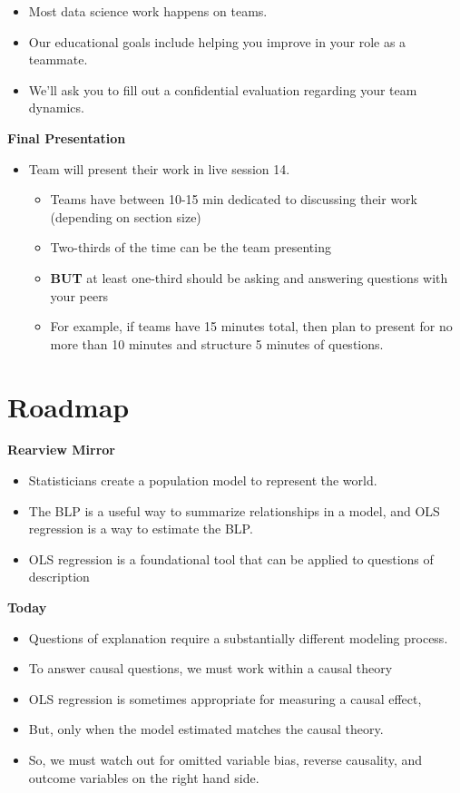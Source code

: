 \documentclass[
]{book}
\providecommand{\tightlist}{%
  \setlength{\itemsep}{0pt}\setlength{\parskip}{0pt}}
\theoremstyle{definition}
\theoremstyle{definition}
\theoremstyle{definition}
\theoremstyle{definition}
\theoremstyle{remark}
\begin{document}
\begin{itemize}
\tightlist
\item
  Most data science work happens on teams.
\item
  Our educational goals include helping you improve in your role as a teammate.
\item
  We'll ask you to fill out a confidential evaluation regarding your team dynamics.
\end{itemize}

\textbf{Final Presentation}

\begin{itemize}
\tightlist
\item
  Team will present their work in live session 14.

  \begin{itemize}
  \tightlist
  \item
    Teams have between 10-15 min dedicated to discussing their work (depending on section size)
  \item
    Two-thirds of the time can be the team presenting
  \item
    \textbf{BUT} at least one-third should be asking and answering questions with your peers
  \item
    For example, if teams have 15 minutes total, then plan to present for no more than 10 minutes and structure 5 minutes of questions.
  \end{itemize}
\end{itemize}

\hypertarget{roadmap-8}{%
\section{Roadmap}\label{roadmap-8}}

\textbf{Rearview Mirror}

\begin{itemize}
\tightlist
\item
  Statisticians create a population model to represent the world.
\item
  The BLP is a useful way to summarize relationships in a model, and OLS regression is a way to estimate the BLP.
\item
  OLS regression is a foundational tool that can be applied to questions of description
\end{itemize}

\textbf{Today}

\begin{itemize}
\tightlist
\item
  Questions of explanation require a substantially different modeling process.
\item
  To answer causal questions, we must work within a causal theory
\item
  OLS regression is sometimes appropriate for measuring a causal effect,
\item
  But, only when the model estimated matches the causal theory.
\item
  So, we must watch out for omitted variable bias, reverse causality, and outcome variables on the right hand side.
\end{itemize}
\end{document}
